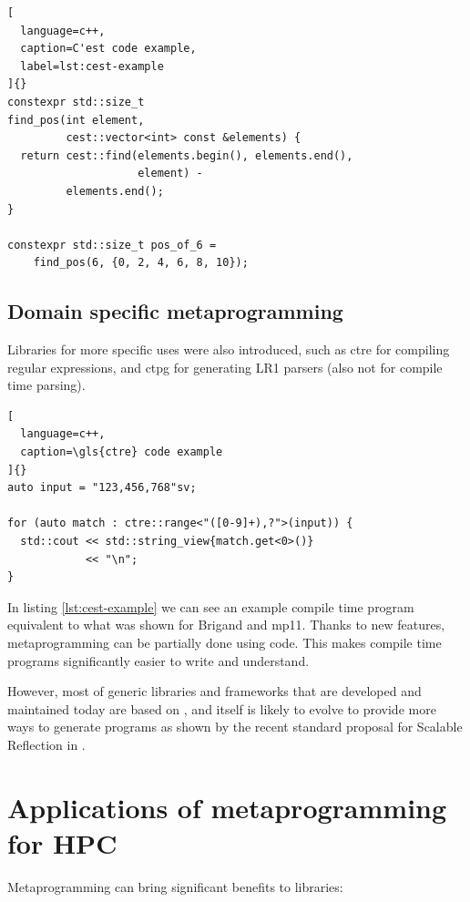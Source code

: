 \documentclass[../main]{subfiles}
\begin{document}
\begin{lstlisting}[
  language=c++,
  caption=C'est code example,
  label=lst:cest-example
]{}
constexpr std::size_t
find_pos(int element,
         cest::vector<int> const &elements) {
  return cest::find(elements.begin(), elements.end(),
                    element) -
         elements.end();
}

constexpr std::size_t pos_of_6 =
    find_pos(6, {0, 2, 4, 6, 8, 10});
\end{lstlisting}

\subsection{
  Domain specific metaprogramming
}

Libraries for more specific uses were also introduced, such as
\gls{ctre} \cite{ctre} for compiling regular expressions,
and \gls{ctpg} \cite{ctpg} for generating LR1 parsers
(also not for compile time parsing).

\begin{lstlisting}[
  language=c++,
  caption=\gls{ctre} code example
]{}
auto input = "123,456,768"sv;

for (auto match : ctre::range<"([0-9]+),?">(input)) {
  std::cout << std::string_view{match.get<0>()}
            << "\n";
}
\end{lstlisting}

In listing \ref{lst:cest-example} we can see an example compile time program
equivalent to what was shown for Brigand and mp11. Thanks to new \cpp features,
metaprogramming can be partially done using \cpp code. This makes
compile time programs significantly easier to write and understand.

However, most of generic libraries and frameworks that are developed
and maintained today are based on \cpp, and \cpp itself is likely to
evolve to provide more ways to generate programs as shown by the recent
standard proposal for Scalable Reflection in \cpp \cite{scalable-reflection}.

\section{
  Applications of metaprogramming for HPC
}

Metaprogramming can bring significant benefits to libraries:
\end{document}
